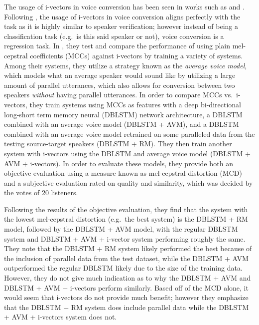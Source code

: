 \documentclass
[
    a4paper,
    twoside,
    12pt,
]
{report}
\begin{document}
The usage of i-vectors in voice conversion has been seen in works such
as \textcite{wu2016} and \textcite{kinnunen2017}. Following
\textcite{kinnunen2017}, the usage of i-vectors in voice conversion
aligns perfectly with the task as it is highly similar to speaker
verification; however instead of being a classification task (e.g.~is
this said speaker or not), voice conversion is a regression task. In
\textcite{wu2016}, they test and compare the performance of using plain
mel-cepstral coefficients (MCCs) against i-vectors by training a variety
of systems. Among their systems, they utilize a strategy known as the
\emph{average voice model}, which models what an average speaker would
sound like by utilizing a large amount of parallel utterances, which
also allows for conversion between two speakers \emph{without} having
parallel utterances. In order to compare MCCs vs.~i-vectors, they train
systems using MCCs as features with a deep bi-directional long-short
term memory neural (DBLSTM) network architecture, a DBLSTM combined with
an average voice model (DBLSTM + AVM), and a DBLSTM combined with an
average voice model retrained on some paralleled data from the testing
source-target speakers (DBLSTM + RM). They then train another system
with i-vectors using the DBLSTM and average voice model (DBLSTM + AVM +
i-vectors). In order to evaluate these models, they provide both an
objective evaluation using a measure known as mel-cepstral distortion
(MCD) and a subjective evaluation rated on quality and similarity, which
was decided by the votes of 20 listeners.

Following the results of the objective evaluation, they find that the
system with the lowest mel-cepstral distortion (e.g.~the best system) is
the DBLSTM + RM model, followed by the DBLSTM + AVM model, with the
regular DBLSTM system and DBLSTM + AVM + i-vector system performing
roughly the same. They note that the DBLSTM + RM system likely performed
the best because of the inclusion of parallel data from the test
dataset, while the DBLSTM + AVM outperformed the regular DBLSTM likely
due to the size of the training data. However, they do not give much
indication as to why the DBLSTM + AVM and DBLSTM + AVM + i-vectors
perform similarly. Based off of the MCD alone, it would seem that
i-vectors do not provide much benefit; however they emphasize that the
DBLSTM + RM system does include parallel data while the DBLSTM + AVM +
i-vectors system does not.
\end{document}
